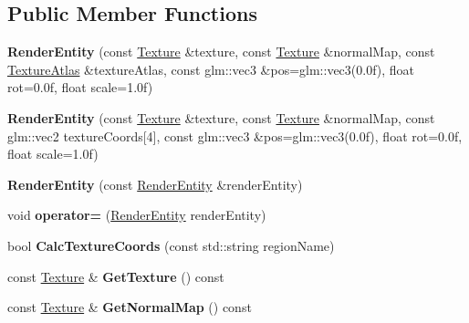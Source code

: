 \subsection*{Public Member Functions}
\begin{DoxyCompactItemize}
\item 
\hypertarget{class_z_e_g_l_1_1_render_entity_a62ea0621b42dae2ec78cd39932f55c09}{}{\bfseries Render\+Entity} (const \hyperlink{class_z_e_g_l_1_1_texture}{Texture} \&texture, const \hyperlink{class_z_e_g_l_1_1_texture}{Texture} \&normal\+Map, const \hyperlink{class_z_e_g_l_1_1_texture_atlas}{Texture\+Atlas} \&texture\+Atlas, const glm\+::vec3 \&pos=glm\+::vec3(0.\+0f), float rot=0.\+0f, float scale=1.\+0f)\label{class_z_e_g_l_1_1_render_entity_a62ea0621b42dae2ec78cd39932f55c09}

\item 
\hypertarget{class_z_e_g_l_1_1_render_entity_a7421ea079ee38c841dc5dcc52f14be72}{}{\bfseries Render\+Entity} (const \hyperlink{class_z_e_g_l_1_1_texture}{Texture} \&texture, const \hyperlink{class_z_e_g_l_1_1_texture}{Texture} \&normal\+Map, const glm\+::vec2 texture\+Coords\mbox{[}4\mbox{]}, const glm\+::vec3 \&pos=glm\+::vec3(0.\+0f), float rot=0.\+0f, float scale=1.\+0f)\label{class_z_e_g_l_1_1_render_entity_a7421ea079ee38c841dc5dcc52f14be72}

\item 
\hypertarget{class_z_e_g_l_1_1_render_entity_a2c94d84990c49135e3decc2b7a24d6ea}{}{\bfseries Render\+Entity} (const \hyperlink{class_z_e_g_l_1_1_render_entity}{Render\+Entity} \&render\+Entity)\label{class_z_e_g_l_1_1_render_entity_a2c94d84990c49135e3decc2b7a24d6ea}

\item 
\hypertarget{class_z_e_g_l_1_1_render_entity_a6fb2edd900e3d39a57b3b2e2b151e203}{}void {\bfseries operator=} (\hyperlink{class_z_e_g_l_1_1_render_entity}{Render\+Entity} render\+Entity)\label{class_z_e_g_l_1_1_render_entity_a6fb2edd900e3d39a57b3b2e2b151e203}

\item 
\hypertarget{class_z_e_g_l_1_1_render_entity_a02454ceb0eb45e5761ed75f2d2095635}{}bool {\bfseries Calc\+Texture\+Coords} (const std\+::string region\+Name)\label{class_z_e_g_l_1_1_render_entity_a02454ceb0eb45e5761ed75f2d2095635}

\item 
\hypertarget{class_z_e_g_l_1_1_render_entity_a7c95293c7f110c9e67e0a0880f3120cb}{}const \hyperlink{class_z_e_g_l_1_1_texture}{Texture} \& {\bfseries Get\+Texture} () const \label{class_z_e_g_l_1_1_render_entity_a7c95293c7f110c9e67e0a0880f3120cb}

\item 
\hypertarget{class_z_e_g_l_1_1_render_entity_a547aec5a4700b863e1a5e16ead4e7119}{}const \hyperlink{class_z_e_g_l_1_1_texture}{Texture} \& {\bfseries Get\+Normal\+Map} () const \label{class_z_e_g_l_1_1_render_entity_a547aec5a4700b863e1a5e16ead4e7119}

\end{DoxyCompactItemize}
